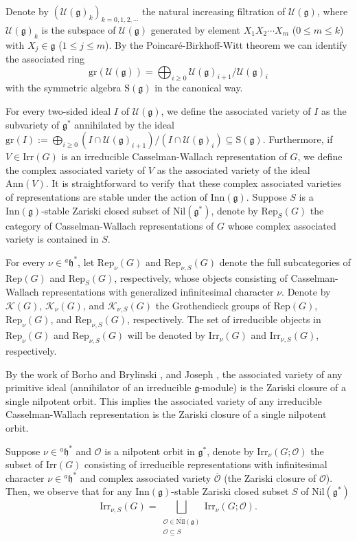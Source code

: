 \documentclass[12pt, a4paper]{amsart}
\numberwithin{equation}{section}
\newcommand{\CK}{{\mathcal {K}}}
\newcommand{\CO}{{\mathcal {O}}}
\newcommand{\CU}{{\mathcal {U}}}
\newcommand{\RS}{{\mathrm {S}}}
\newcommand{\fg}{\mathfrak{g}}
\newcommand{\fh}{\mathfrak{h}}
\newcommand{\Irr}{{\mathrm{Irr}}}
\newcommand{\Inn}{{\mathrm{Inn}}}
\newcommand{\Ann}{{\mathrm{Ann}}}
\newcommand{\Rep}{{\mathrm{Rep}}}
\newcommand{\Nil}{{\mathrm{Nil}}}
\renewcommand{\bar}{\overline}
\begin{document}
Denote by $(\CU(\fg)_{k})_{k = 0,1,2,\cdots}$ the natural increasing filtration of $\CU(\fg)$, where $\CU(\fg)_{k}$ is the subspace of $\CU(\fg)$ generated by element $X_{1} X_{2} \cdots X_{m}$ ($0 \leq m \leq k$) with $X_{j} \in \fg$ ($1 \leq j \leq m$). By the Poincar\'e-Birkhoff-Witt theorem we can identify the associated ring
\[
    \mathrm{gr}(\CU(\fg)) = \bigoplus_{i \geq 0}\CU(\fg)_{i+1} / \CU(\fg)_{i}
\]   
with the symmetric algebra $\mathrm{S}(\fg)$ in the canonical way.

For every two-sided ideal $I$ of $\CU(\fg)$, we define the associated variety of $I$ as the subvariety of $\fg^*$ annihilated by the ideal $\mathrm{gr}(I) := \bigoplus_{i \geq 0} (I \cap \CU(\fg)_{i+1})/(I \cap \CU(\fg)_i) \subseteq \RS(\fg)$.  Furthermore, if $V \in \Irr(G)$ is an irreducible Casselman-Wallach representation of $G$, we define the complex associated variety of $V$ as the associated variety of the ideal $\Ann(V)$. It is straightforward to verify that these complex associated varieties of representations are stable under the action of $\Inn(\mathfrak{g})$. Suppose $S$ is a $\Inn(\fg)$-stable Zariski closed subset of $\Nil(\fg^*)$, denote by $\Rep_S(G)$ the category of Casselman-Wallach representations of $G$ whose complex associated variety is contained in $S$.

For every $\nu \in {^{a}\fh^*}$, let $\Rep_{\nu}(G)$ and $\Rep_{\nu,S}(G)$ denote the full subcategories of $\Rep(G)$ and $\Rep_S(G)$, respectively, whose objects consisting of Casselman-Wallach representations with generalized infinitesimal character $\nu$. Denote by $\CK(G)$, $\CK_{\nu}(G)$, and $\CK_{\nu,S}(G)$ the Grothendieck groups of $\Rep(G)$, $\Rep_{\nu}(G)$, and $\Rep_{\nu,S}(G)$, respectively. The set of irreducible objects in $\Rep_{\nu}(G)$ and $\Rep_{\nu,S}(G)$ will be denoted by $\Irr_{\nu}(G)$ and $\Irr_{\nu,S}(G)$, respectively. 

By the work of Borho and Brylinski \cite{BB}, and Joseph \cite{Jos}, the associated variety of any primitive ideal (annihilator of an irreducible $\fg$-module) is the Zariski closure of a single nilpotent orbit. This implies the associated variety of any irreducible Casselman-Wallach representation is the Zariski closure of a single nilpotent orbit.

Suppose $\nu \in {^{a}\fh^*}$ and $\CO$ is a nilpotent orbit in $\fg^*$,   denote by $\Irr_{\nu}(G;\CO)$ the subset of $\Irr(G)$ consisting of irreducible representations with infinitesimal character $\nu \in {^{a}\fh^*}$ and complex associated variety $\bar{\CO}$ (the Zariski closure of $\CO$). Then, we observe that for any $\Inn(\fg)$-stable Zariski closed subset $S$ of $\Nil(\fg^*)$
\begin{equation}\label{(1.3)}
    \Irr_{\nu,S}(G) = \bigsqcup_{\substack{\CO \in \bar{\Nil}(\fg) \\ \CO \subseteq S}} \Irr_{\nu}(G;\CO).
\end{equation}
\end{document}
